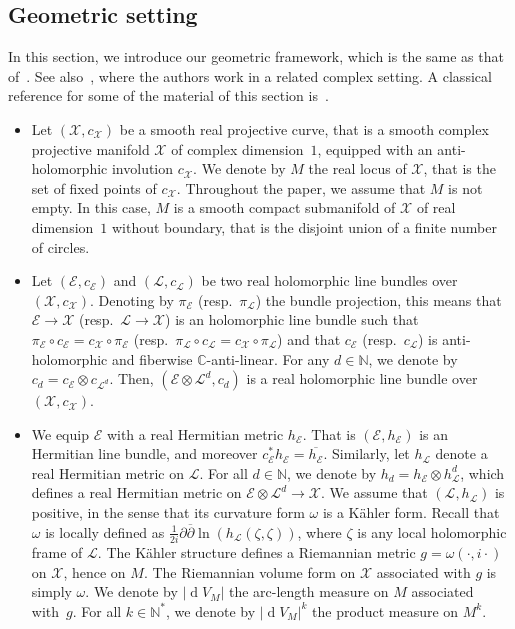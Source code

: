 \documentclass[AHL,Unicode,longabstracts,published]{cedram}
\DeclareMathOperator{\dmesure}{d}
\newcommand{\E}{\mathcal{E}}
\newcommand{\X}{\mathcal{X}}
\renewcommand{\L}{\mathcal{L}}
\newcommand{\C}{\mathbb{C}}
\newcommand{\N}{\mathbb{N}}
\newcommand{\debar}{\overline{\partial}}
\newcommand{\norm}[1]{\left\lvert #1 \right\rvert}
\newcommand{\rmes}[1]{\norm{\dmesure\! V_{#1}}}
\renewcommand{\bar}{\overline}
\begin{document}
\subsection{Geometric setting}\label{subsec geometric setting}

In this section, we introduce our geometric framework, which is the same as that of~\cite{Anc2019,GW2016,Let2016,Let2019,LP2019}. See also~\cite{BSZ2000a,SZ1999,SZ2010}, where the authors work in a related complex setting. A classical reference for some of the material of this section is~\cite{GH1994}.
\begin{itemize}
\item Let $(\X,c_{\X})$ be a smooth real projective curve, that is a smooth complex projective manifold $\X$ of complex dimension~$1$, equipped with an anti-holomorphic involution $c_{\X}$. We denote by $M$ the real locus of $\X$, that is the set of fixed points of $c_\X$. Throughout the paper, we assume that $M$ is not empty. In this case, $M$ is a smooth compact submanifold of $\X$ of real dimension~$1$ without boundary, that is the disjoint union of a finite number of circles.

\item Let $(\E,c_\E)$ and $(\L,c_\L)$ be two real holomorphic line bundles over $(\X,c_\X)$. Denoting by $\pi_\E$ (resp.~$\pi_\L$) the bundle projection, this means that $\E \to \X$ (resp.~$\L \to \X$) is an holomorphic line bundle such that $\pi_\E \circ c_\E = c_\X \circ \pi_\E$ (resp.~$\pi_\L \circ c_\L = c_\X \circ \pi_\L$) and that $c_\E$ (resp.~$c_\L$) is anti-holomorphic and fiberwise $\C$-anti-linear. For any $d \in \N$, we denote by $c_d = c_\E \otimes c_{\L^d}$. Then, $(\E \otimes \L^d,c_d)$ is a real holomorphic line bundle over $(\X,c_\X)$.

\item We equip $\E$ with a real Hermitian metric $h_\E$. That is $(\E,h_\E)$ is an Hermitian line bundle, and moreover $c_\E^*h_\E = \bar{h_\E}$. Similarly, let $h_\L$ denote a real Hermitian metric on $\L$. For all $d \in \N$, we denote by $h_d = h_\E \otimes h_\L^d$, which defines a real Hermitian metric on $\E \otimes \L^d \to \X$. We assume that $(\L,h_\L)$ is positive, in the sense that its curvature form $\omega$ is a K\"ahler form. Recall that $\omega$ is locally defined as $\tfrac{1}{2i}\partial\debar \ln(h_\L(\zeta,\zeta))$, where $\zeta$ is any local holomorphic frame of $\L$. The K\"ahler structure defines a Riemannian metric $g = \omega(\cdot,i\cdot)$ on $\X$, hence on $M$. The Riemannian volume form on $\X$ associated with $g$ is simply $\omega$. We denote by $\rmes{M}$ the arc-length measure on $M$ associated with~$g$. For all $k \in \N^*$, we denote by $\rmes{M}^k$ the product measure on $M^k$.


\end{itemize}
\end{document}
